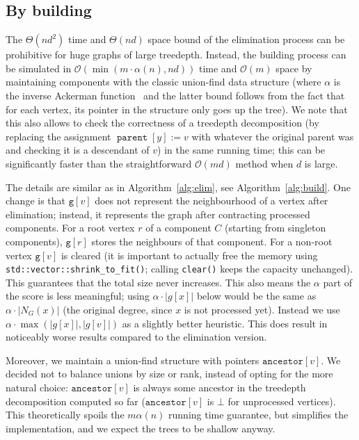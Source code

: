 \documentclass{timgad}
\newcommand{\Oh}{\ensuremath{\mathcal{O}}}
\DeclareMathOperator{\parent}{\texttt{parent}}
\begin{document}
\pagebreak[3] 

\subsection{By building}
The $\Theta(nd^2)$ time and $\Theta(nd)$ space bound of the elimination process can be prohibitive for huge graphs of large treedepth.
Instead, the building process can be simulated in $\Oh(\min(m \cdot \alpha(n), n d))$ time and $\Oh(m)$ space by maintaining components with the classic union-find data structure (where $\alpha$ is the inverse Ackerman function~\cite{TarjanL84} and the latter bound follows from the fact that for each vertex, its pointer in the structure only goes up the tree).
We note that this also allows to check the correctness of a treedepth decomposition (by replacing the assignment $\parent[y] := v$ with whatever the original parent was and checking it is a descendant of $v$) in the same running time;
this can be significantly faster than the straightforward $\Oh(md)$ method when $d$ is large.

The details are similar as in Algorithm~\ref{alg:elim}, see Algorithm~\ref{alg:build}.
One change is that $\texttt{g}[v]$ does not represent the neighbourhood of a vertex after elimination;
instead, it represents the graph after contracting processed components.
For a root vertex $r$ of a component $C$ (starting from singleton components), $\texttt{g}[r]$ stores the neighbours of that component.
For a non-root vertex $\texttt{g}[v]$ is cleared (it is important to actually free the memory using \texttt{std::vector::shrink\_to\_fit()}; calling \texttt{clear()} keeps the capacity unchanged).
This guarantees that the total size never increases.
This also means the $\alpha$ part of the score is less meaningful;
using $\alpha \cdot |g[x]|$ below would be the same as $\alpha \cdot |N_G(x)|$ (the original degree, since $x$ is not processed yet).
Instead we use $\alpha \cdot \max(|g[x]|, |g[v]|)$ as a slightly better heuristic.
This does result in noticeably worse results compared to the elimination version.

Moreover, we maintain a union-find structure with pointers $\texttt{ancestor}[v]$.
We decided not to balance unions by size or rank, instead of opting for the more natural choice:
$\texttt{ancestor}[v]$ is always some ancestor in the treedepth decomposition computed so far
($\texttt{ancestor}[v]$ is $\bot$ for unprocessed vertices).
This theoretically spoils the $m \alpha(n)$ running time guarantee, but simplifies the implementation, and we expect the trees to be shallow anyway.
\end{document}
